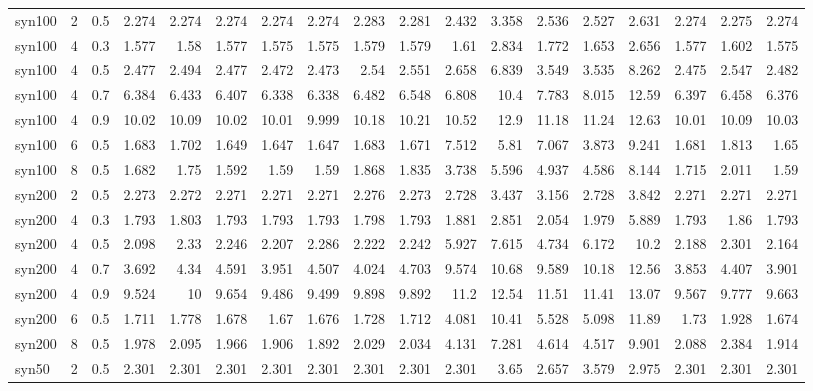 \begin{table}
\begin{tabular}{lrrrrrrrrrrrrrrrrr}
syn100 & 2 & 0.5 & 2.274 & 2.274 & 2.274 & 2.274 & 2.274 & 2.283 & 2.281 & 2.432 & 3.358 & 2.536 & 2.527 & 2.631 & 2.274 & 2.275 & 2.274 \\
syn100 & 4 & 0.3 & 1.577 & 1.58 & 1.577 & 1.575 & 1.575 & 1.579 & 1.579 & 1.61 & 2.834 & 1.772 & 1.653 & 2.656 & 1.577 & 1.602 & 1.575 \\
syn100 & 4 & 0.5 & 2.477 & 2.494 & 2.477 & 2.472 & 2.473 & 2.54 & 2.551 & 2.658 & 6.839 & 3.549 & 3.535 & 8.262 & 2.475 & 2.547 & 2.482 \\
syn100 & 4 & 0.7 & 6.384 & 6.433 & 6.407 & 6.338 & 6.338 & 6.482 & 6.548 & 6.808 & 10.4 & 7.783 & 8.015 & 12.59 & 6.397 & 6.458 & 6.376 \\
syn100 & 4 & 0.9 & 10.02 & 10.09 & 10.02 & 10.01 & 9.999 & 10.18 & 10.21 & 10.52 & 12.9 & 11.18 & 11.24 & 12.63 & 10.01 & 10.09 & 10.03 \\
syn100 & 6 & 0.5 & 1.683 & 1.702 & 1.649 & 1.647 & 1.647 & 1.683 & 1.671 & 7.512 & 5.81 & 7.067 & 3.873 & 9.241 & 1.681 & 1.813 & 1.65 \\
syn100 & 8 & 0.5 & 1.682 & 1.75 & 1.592 & 1.59 & 1.59 & 1.868 & 1.835 & 3.738 & 5.596 & 4.937 & 4.586 & 8.144 & 1.715 & 2.011 & 1.59 \\
syn200 & 2 & 0.5 & 2.273 & 2.272 & 2.271 & 2.271 & 2.271 & 2.276 & 2.273 & 2.728 & 3.437 & 3.156 & 2.728 & 3.842 & 2.271 & 2.271 & 2.271 \\
syn200 & 4 & 0.3 & 1.793 & 1.803 & 1.793 & 1.793 & 1.793 & 1.798 & 1.793 & 1.881 & 2.851 & 2.054 & 1.979 & 5.889 & 1.793 & 1.86 & 1.793 \\
syn200 & 4 & 0.5 & 2.098 & 2.33 & 2.246 & 2.207 & 2.286 & 2.222 & 2.242 & 5.927 & 7.615 & 4.734 & 6.172 & 10.2 & 2.188 & 2.301 & 2.164 \\
syn200 & 4 & 0.7 & 3.692 & 4.34 & 4.591 & 3.951 & 4.507 & 4.024 & 4.703 & 9.574 & 10.68 & 9.589 & 10.18 & 12.56 & 3.853 & 4.407 & 3.901 \\
syn200 & 4 & 0.9 & 9.524 & 10 & 9.654 & 9.486 & 9.499 & 9.898 & 9.892 & 11.2 & 12.54 & 11.51 & 11.41 & 13.07 & 9.567 & 9.777 & 9.663 \\
syn200 & 6 & 0.5 & 1.711 & 1.778 & 1.678 & 1.67 & 1.676 & 1.728 & 1.712 & 4.081 & 10.41 & 5.528 & 5.098 & 11.89 & 1.73 & 1.928 & 1.674 \\
syn200 & 8 & 0.5 & 1.978 & 2.095 & 1.966 & 1.906 & 1.892 & 2.029 & 2.034 & 4.131 & 7.281 & 4.614 & 4.517 & 9.901 & 2.088 & 2.384 & 1.914 \\
syn50 & 2 & 0.5 & 2.301 & 2.301 & 2.301 & 2.301 & 2.301 & 2.301 & 2.301 & 2.301 & 3.65 & 2.657 & 3.579 & 2.975 & 2.301 & 2.301 & 2.301 \\

\end{tabular}
\end{table}
